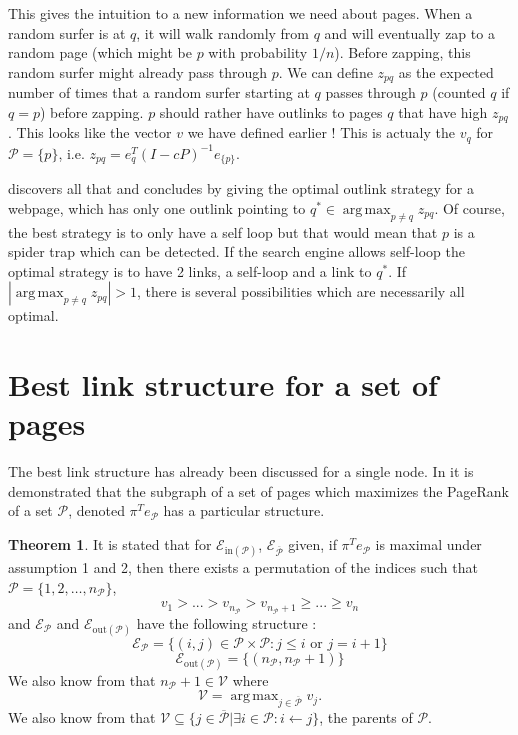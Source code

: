 \documentclass{article}
\DeclareMathOperator*{\argmax}{arg\,max}
\newcommand{\1}{\mathbf{1}}
\theoremstyle{definition}
\newtheorem{mytheo}[mydef]{Theorem}
\begin{document}
This gives the intuition to a new information we need about pages.
When a random surfer is at \(q\), it will walk randomly from \(q\) and will eventually zap to a random page (which might be \(p\) with probability \(1/n\)).
Before zapping, this random surfer might already pass through \(p\).
We can define \(z_{pq}\) as the expected number of times that a random surfer starting at \(q\) passes through \(p\) (counted \(q\) if \(q=p\)) before zapping.
\(p\) should rather have outlinks to pages \(q\) that have high \(z_{pq}\).
This looks like the vector \(v\) we have defined earlier !
This is actualy the \(v_q\) for \(\mathcal{P} = \{p\}\), i.e. \(z_{pq} = e_q^T(I-cP)^{-1}e_{\{p\}}\).

\cite{avrachenkov2006effect} discovers all that and concludes by giving the optimal outlink strategy for a webpage,
which has only one outlink pointing to \(q^* \in \argmax_{p \neq q} z_{pq}\).
Of course, the best strategy is to only have a self loop but that would mean that \(p\) is a spider trap which can be detected.
If the search engine allows self-loop the optimal strategy is to have 2 links, a self-loop and a link to \(q^*\).
If \(|\argmax_{p \neq q} z_{pq}| > 1\), there is several possibilities which are necessarily all optimal.



\section{Best link structure for a set of pages}
The best link structure has already been discussed for a single node.
In \cite{de2008maximizing} it is demonstrated that the subgraph of a set of pages which maximizes the PageRank of a set \(\mathcal{P}\), denoted \(\pi^T e_{\mathcal{P}}\) has a particular structure.

\begin{mytheo}
  It is stated that for \(\mathcal{E}_{\text{in}(\mathcal{P})}\), \(\mathcal{E}_{\overline{\mathcal{P}}}\) given, if  \(\pi^T e_{\mathcal{P}}\) is maximal under assumption 1 and 2, then there exists a permutation of the indices such that
\(\mathcal{P} = \{1,2, \hdots, n_{\mathcal{P}}\}\),
\[ v_1 > ... > v_{n_\mathcal{P}}>v_{n_{\mathcal{P}}+1} \geq ... \geq v_n\]
and \(\mathcal{E}_{\mathcal{P}}\) and \(\mathcal{E}_{\text{out}(\mathcal{P})} \) have the following structure :
\[\mathcal{E}_{\mathcal{P}} = \{(i,j) \in \mathcal{P}\times \mathcal{P} : j \leq i \text{ or }j = i+1 \}\]
\[\mathcal{E}_{\text{out}(\mathcal{P})} = \{(n_{\mathcal{P}},n_{\mathcal{P}}+1)\}\]
We also know from \cite{de2008maximizing} that \(n_\mathcal{P}+1 \in \mathcal{V}\) where
\[ \mathcal{V} = \argmax_{j \in \overline{\mathcal{P}}} v_j. \]
We also know from \cite{de2008maximizing} that \(\mathcal{V} \subseteq \{j \in \overline{\mathcal{P}} | \exists i \in \mathcal{P} : i \leftarrow j\}\), the parents of \(\mathcal{P}\).
\label{thm:optstruct}
\end{mytheo}
\end{document}
